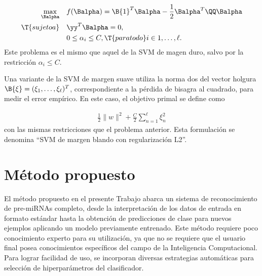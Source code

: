 \begin{align}
\begin{split}\label{svmprob-dual-soft}
    \max_{\Balpha} \quad
    & f(\Balpha) = \B{1}^T\Balpha-\frac{1}{2}\Balpha^T\QQ\Balpha\\
    \T{sujeto a}\quad & \yy^T\Balpha = 0, \\
                      & 0\leq\alpha_i\leq C, \T{ para todo } i\in {1,\ldots,\ell }.
\end{split}\end{align}
Este problema es el mismo que aquel de la SVM de magen duro, salvo por la restricción
$\alpha_i\leq C$.

Una variante de la SVM de margen suave utiliza la norma dos del
vector holgura $\B{\xi}=(\xi_1,\ldots,\xi_\ell)^T$, correspondiente
a la pérdida de bisagra al cuadrado, para medir el error empírico.
En este caso, el objetivo primal se define como

\begin{align}
  \label{svm-l2}
  \frac{1}{2}\|w\|^2+\frac{C}{2}\sum_{n=1}^{\ell}\xi_n^2
\end{align}
con las mismas restricciones que el problema anterior.
Esta formulación se denomina ``SVM de margen blando con regularización L2''.

\chapter{Método propuesto}
El método propuesto en el presente Trabajo abarca un sistema de
reconocimiento de pre-miRNAs completo, desde la interpretación de los
datos de entrada en formato estándar hasta la obtención de
predicciones de clase para nuevos ejemplos aplicando un modelo
previamente entrenado.  Este método requiere poco conocimiento experto
para su utilización, ya que no se requiere que el usuario final posea
conocimientos específicos del campo de la Inteligencia
Computacional. Para lograr facilidad de uso, se incorporan diversas
estrategias automáticas para selección de hiperparámetros del
clasificador.